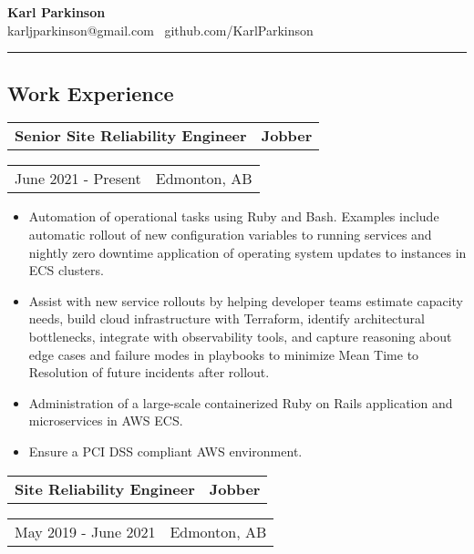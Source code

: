 \documentclass[10pt,letterpaper]{article}
\makeatletter
\newcommand{\headerrow}[2]
{\begin{tabular*}{\linewidth}{l@{\extracolsep{\fill}}r}
	#1 &
	#2 \\
\end{tabular*}}
\makeatother
\begin{document}
\begin{center}
{\LARGE \textbf{Karl Parkinson}}
\\
karljparkinson@gmail.com \textbullet \ github.com/KarlParkinson

\end{center}

\hrule

\subsection*{Work Experience}
       \headerrow
       	        {\textbf{Senior Site Reliability Engineer}}
	        {\textbf{Jobber}}
	\headerrow
		{June 2021 - Present}
		{Edmonton, AB}
		
       \begin{itemize}
          \itemsep0em
                \item Automation of operational tasks using Ruby and Bash. Examples include automatic rollout of new configuration variables to running services and nightly zero downtime application of operating system updates to instances in ECS clusters.
                \item Assist with new service rollouts by helping developer teams estimate capacity needs, build cloud infrastructure with Terraform, identify architectural bottlenecks, integrate with observability tools, and capture reasoning about edge cases and failure modes in playbooks to minimize Mean Time to Resolution of future incidents after rollout.
                \item Administration of a large-scale containerized Ruby on Rails application and microservices in AWS ECS.
                \item Ensure a PCI DSS compliant AWS environment.
        \end{itemize}
       \headerrow
       	        {\textbf{Site Reliability Engineer}}
	        {\textbf{Jobber}}
	\headerrow
		{May 2019 - June 2021}
		{Edmonton, AB}
		
\end{document}
